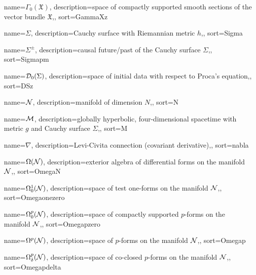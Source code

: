 {
	name=\ensuremath{\Gamma_0(\mathfrak{X})},
	description={space of compactly supported smooth sections of the vector bundle $\mathfrak{X}$,},
	sort={GammaXz}
}





{
	name=\ensuremath{\Sigma},
	description={Cauchy surface with Riemannian metric $h$,},
	sort={Sigma}
}


{
	name=\ensuremath{\Sigma^\pm},
	description={causal future/past of the Cauchy surface $\Sigma$,},
	sort={Sigmapm}
}

{
	name=\ensuremath{\Dzs},
	description={space of initial data with respect to Proca's equation,},
	sort={DSz}
}



{
	name=\ensuremath{\N},
	description={manifold of dimension $N$,},
	sort={N}
}

{
	name=\ensuremath{\M},
	description={globally hyperbolic, four-dimensional spacetime with metric $g$ and Cauchy surface $\Sigma$,},
	sort={M}
}



{
	name=\ensuremath{\nabla},
	description={Levi-Civita connection (covariant derivative),},
	sort={nabla}
}






{
	name=\ensuremath{\Omega(\N)},
	description={exterior algebra of differential forms on the manifold $\mathcal{N}$,},
	sort={OmegaN}
}


{
	name=\ensuremath{\Omega^1_0(\N)},
	description={space of test one-forms on the manifold $\mathcal{N}$,},
	sort={Omegaonezero}
}

{
	name=\ensuremath{\Omega^p_0(\N)},
	description={space of compactly supported $p$-forms on the manifold $\mathcal{N}$,},
	sort={Omegapzero}
}

{
	name=\ensuremath{\Omega^p(\N)},
	description={space of $p$-forms on the manifold $\mathcal{N}$,},
	sort={Omegap}
}

{
	name=\ensuremath{\Omega^p_{\delta}(\N)},
	description={space of co-closed $p$-forms on the manifold $\mathcal{N}$,},
	sort={Omegapdelta}
}

